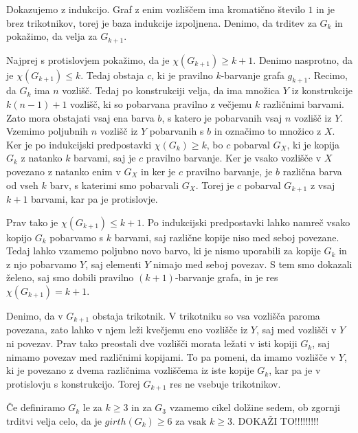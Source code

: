 \documentclass[mat1, tisk]{fmfdelo}
\begin{document}
    \begin{dokaz}
        Dokazujemo z indukcijo. Graf z enim vozliščem ima kromatično število $1$ in je brez trikotnikov, torej je baza indukcije izpoljnena. 
        Denimo, da trditev za $G_k$ in pokažimo, da velja za $G_{k+1}$.

        Najprej s protislovjem pokažimo, da je $\chi(G_{k+1}) \geq k + 1$. Denimo nasprotno, da je $\chi(G_{k+1}) \leq k$. Tedaj obstaja $c$, 
        ki je pravilno $k$-barvanje grafa $g_{k+1}$. Recimo, da $G_k$ ima $n$ vozlišč. Tedaj po konstrukciji velja, da ima množica $Y$ iz 
        konstrukcije $k(n - 1) + 1$ vozlišč, ki so pobarvana pravilno z večjemu $k$ različnimi barvami. Zato mora obstajati vsaj ena barva 
        $b$, s katero je pobarvanih vsaj $n$ vozlišč iz $Y$. Vzemimo poljubnih $n$ vozlišč iz $Y$ pobarvanih s $b$ in označimo to množico 
        z $X$. Ker je po indukcijski predpostavki $\chi(G_k) \geq k$, bo $c$ pobarval $G_X$, ki je kopija $G_k$ z natanko $k$ barvami, saj 
        je $c$ pravilno barvanje. Ker je vsako vozlišče v $X$ povezano z natanko enim v $G_X$ in ker je $c$ pravilno barvanje, je $b$ različna
        barva od vseh $k$ barv, s katerimi smo pobarvali $G_X$. Torej je $c$ pobarval $G_{k+1}$ z vsaj $k + 1$ barvami, kar pa je protislovje.

        Prav tako je $\chi(G_{k+1}) \leq k + 1$. Po indukcijski predpostavki lahko namreč vsako kopijo $G_k$ pobarvamo s $k$ barvami, saj različne
        kopije niso med seboj povezane. Tedaj lahko vzamemo poljubno novo barvo, ki je nismo uporabili za kopije $G_k$ in z njo pobarvamo $Y$,
        saj elementi $Y$ nimajo med seboj povezav. S tem smo dokazali želeno, saj smo dobili pravilno $(k+1)$-barvanje grafa, in je res 
        $\chi(G_{k+1}) = k + 1$.

        Denimo, da v $G_{k+1}$ obstaja trikotnik. V trikotniku so vsa vozlišča paroma povezana, zato lahko v njem leži kvečjemu eno vozlišče iz $Y$,
        saj med vozlišči v $Y$ ni povezav. Prav tako preostali dve vozlišči morata ležati v isti kopiji $G_k$, saj nimamo povezav med različnimi kopijami.
        To pa pomeni, da imamo vozlišče v $Y$, ki je povezano z dvema različnima vozliščema iz iste kopije $G_k$, kar pa je v protislovju s konstrukcijo.
        Torej $G_{k+1}$ res ne vsebuje trikotnikov.

    \end{dokaz}

    \begin{opomba}
        Če definiramo $G_k$ le za $k \geq 3$ in za $G_3$ vzamemo cikel dolžine sedem, ob zgornji trditvi velja celo, da je $girth(G_k) \geq 6$ za vsak 
        $k \geq 3$. DOKAŽI TO!!!!!!!!!
    \end{opomba}
\end{document}
